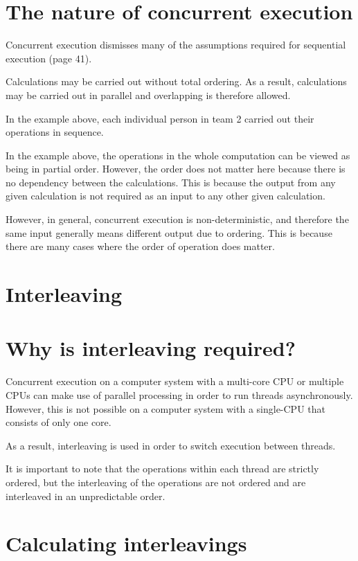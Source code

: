 \documentclass[a4paper]{systems-software}
\begin{document}
\section*{The nature of concurrent execution}

Concurrent execution dismisses many of the assumptions required for sequential execution (page 41).

Calculations may be carried out without total ordering. As a result, calculations may be carried out in parallel and overlapping is therefore allowed.

In the example above, each individual person in team 2 carried out their operations in sequence.

In the example above, the operations in the whole computation can be viewed as being in partial order. However, the order does not matter here because there is no dependency between the calculations. This is because the output from any given calculation is not required as an input to any other given calculation.

However, in general, concurrent execution is non-deterministic, and therefore the same input generally means different output due to ordering. This is because there are many cases where the order of operation does matter.


\section{Interleaving}

\section*{Why is interleaving required?}

Concurrent execution on a computer system with a multi-core CPU or multiple CPUs can make use of parallel processing in order to run threads asynchronously. However, this is not possible on a computer system with a single-CPU that consists of only one core.

As a result, interleaving is used in order to switch execution between threads.

It is important to note that the operations within each thread are strictly ordered, but the interleaving of the operations are not ordered and are interleaved in an unpredictable order.


\section*{Calculating interleavings}
\end{document}
